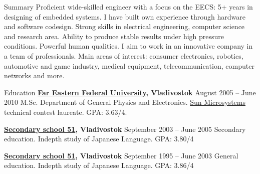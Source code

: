 \documentclass{template}
\begin{document}

\begin{rSection}{Summary}
Proficient wide-skilled engineer with a focus on the EECS: 5+ years in designing of embedded systems. I have built own experience through hardware and software codesign. Strong skills in electrical engineering, computer science and research area. Ability to produce stable results under high pressure conditions. Powerful human qualities. I aim to work in an innovative company in a team of professionals. Main areas of interest: consumer electronics, robotics, automotive and game industry, medical equipment, telecommunication, computer networks and more.
\end{rSection}


\begin{rSection}{Education}
{\bf \href{http://wwwold.dvfu.ru/en/web/fefu/}{Far Eastern Federal University}, Vladivostok} \hfill {August 2005 -- June 2010} \newline
M.Sc. Department of General Physics and Electronics. \newline
\href{http://www.oracle.com}{Sun Microsystems} technical contest laureate. \newline 
GPA: 3.63/4.

{\bf \href{http://www.school51.pupils.ru}{Secondary school 51}, Vladivostok} \hfill {September 2003 -- June 2005} \newline
Secondary education. \newline
Indepth study of Japanese Language. \newline
GPA: 3.80/4

{\bf \href{http://www.school51.pupils.ru}{Secondary school 51}, Vladivostok} \hfill {September 1995 -- June 2003} \newline
General education. \newline
Indepth study of Japanese Language. \newline
GPA: 3.86/4
\end{rSection}

\end{document}
